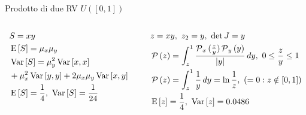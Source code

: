 \documentclass[asd-beamer.tex]{subfiles}%
\begin{document}
\begin{wordonframe}{Prodotto di due RV $U([0,1])$}
	\begin{columns}[T]
		\begin{column}{0.5\textwidth}
			\begin{align*}
			&S=xy\\
			&\operatorname{E}{[S]}=\mu_x\mu_y\\
			&\operatorname{Var}{[S]}=\mu_y^2\operatorname{Var}{[x,x]}\\
			&+\mu_x^2\operatorname{Var}{[y,y]}+2\mu_x\mu_y\operatorname{Var}{[x,y]}\\
			&\operatorname{E}{[S]}=\frac{1}{4},\ \operatorname{Var}{[S]}=\frac{1}{24}
			\end{align*}
		\end{column}
		\begin{column}{0.5\textwidth}
			\begin{align*}
			&z=xy,\ z_2=y,\ \det{J}=y\\
			&\prob{(z)}=\int_z^1\frac{\prob_x{(\frac{z}{y})}\prob_y{(y)}}{|y|}\,dy,\ 0\leq\frac{z}{y}\leq1\\
			&\prob{(z)}=\int_z^1\frac{1}{y}\,dy=\ln{\frac{1}{z}},\ (=0: z\notin[0,1])\\
			&\E{[z]}=\frac{1}{4},\ \var{[z]}=\num{0.0486}
			\end{align*}
		\end{column}
	\end{columns}
\end{wordonframe}
\end{document}
